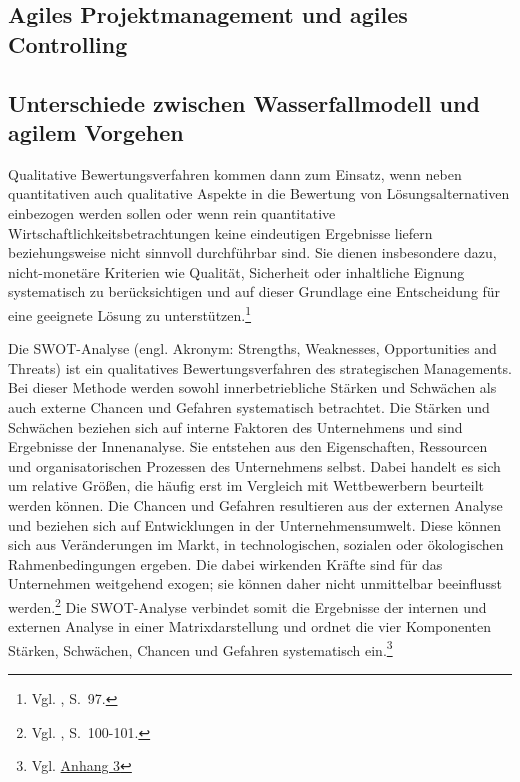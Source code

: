 \documentclass[
    12pt, 
    a4paper,
    ]{scrartcl} %
\begin{document}
\subsection{Agiles Projektmanagement und agiles Controlling}


\subsection{Unterschiede zwischen Wasserfallmodell und agilem Vorgehen}
Qualitative Bewertungsverfahren kommen dann zum Einsatz, wenn neben quantitativen auch qualitative Aspekte in die Bewertung von Lösungsalternativen einbezogen werden sollen oder wenn rein quantitative Wirtschaftlichkeitsbetrachtungen keine eindeutigen Ergebnisse liefern beziehungsweise nicht sinnvoll durchführbar sind. Sie dienen insbesondere dazu, nicht-monetäre Kriterien wie Qualität, Sicherheit oder inhaltliche Eignung systematisch zu berücksichtigen und auf dieser Grundlage eine Entscheidung für eine geeignete Lösung zu unterstützen.\footnote{Vgl. \cite{Koch_Geschaeftsprozessmanagement}, S.~97.} 

Die SWOT-Analyse (engl. Akronym: Strengths, Weaknesses, Opportunities and Threats) ist ein qualitatives Bewertungsverfahren des strategischen Managements. Bei dieser Methode werden sowohl innerbetriebliche Stärken und Schwächen als auch externe Chancen und Gefahren systematisch betrachtet. Die Stärken und Schwächen beziehen sich auf interne Faktoren des Unternehmens und sind Ergebnisse der Innenanalyse. Sie entstehen aus den Eigenschaften, Ressourcen und organisatorischen Prozessen des Unternehmens selbst. Dabei handelt es sich um relative Größen, die häufig erst im Vergleich mit Wettbewerbern beurteilt werden können. Die Chancen und Gefahren resultieren aus der externen Analyse und beziehen sich auf Entwicklungen in der Unternehmensumwelt. Diese können sich aus Veränderungen im Markt, in technologischen, sozialen oder ökologischen Rahmenbedingungen ergeben. Die dabei wirkenden Kräfte sind für das Unternehmen weitgehend exogen; sie können daher nicht unmittelbar beeinflusst werden.\footnote{Vgl. \cite{Koch_Geschaeftsprozessmanagement}, S.~100-101.}
Die SWOT-Analyse verbindet somit die Ergebnisse der internen und externen Analyse in einer Matrixdarstellung und ordnet die vier Komponenten Stärken, Schwächen, Chancen und Gefahren systematisch ein.\footnote{Vgl. \hyperref[sec:Anhang3]{Anhang 3}} 
\end{document}
